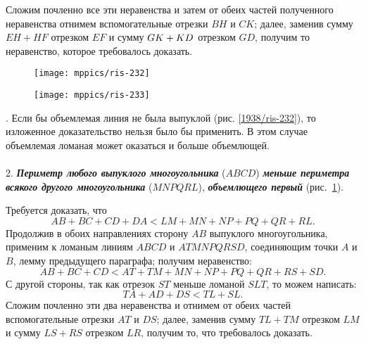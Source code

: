 Сложим почленно все эти неравенства и затем от обеих частей полученного неравенства отнимем вспомогательные отрезки $BH$ и $CK$;
далее, заменив сумму $EH+HF$ отрезком $EF$ и сумму $GK\z+KD$ отрезком $GD$, получим то неравенство, которое требовалось доказать.

\begin{figure}[!ht]
\begin{minipage}{.48\textwidth}
\centering
\texttt{[image: mppics/ris-232]}
\end{minipage}\hfill
\begin{minipage}{.48\textwidth}
\centering
\texttt{[image: mppics/ris-233]}
\end{minipage}

\medskip

\begin{minipage}{.48\textwidth}
\centering
\caption{}\label{1938/ris-232}
\end{minipage}\hfill
\begin{minipage}{.48\textwidth}
\centering
\caption{}\label{1938/ris-233}
\end{minipage}
\vskip-4mm
\end{figure}

{\small

\smallskip
\mbox{.}
Если бы объемлемая линия не была выпуклой (рис. \ref{1938/ris-232}), то изложенное доказательство нельзя было бы применить.
В этом случае объемлемая ломаная может оказаться и больше объемлющей.

}

\paragraph{}\label{1938/233}
 2.
\textbf{\emph{Периметр любого выпуклого многоугольника}} ($ABCD$) \textbf{\emph{меньше периметра всякого другого многоугольника}} ($MNPQRL$), \textbf{\emph{объемлющего первый}} (рис.~\ref{1938/ris-233}).


Требуется доказать, что
\[AB+BC+CD+DA < LM+MN+NP+PQ+QR+RL.\]
Продолжив в обоих направлениях сторону $AB$ выпуклого многоугольника, применим к ломаным линиям $ABCD$ и $ATMNPQRSD$, соединяющим точки $A$ и $B$, лемму предыдущего параграфа;
получим неравенство:
\[AB+BC+CD<AT+TM+MN+NP+PQ+QR+RS+SD.\]
С другой стороны, так как отрезок $ST$ меньше ломаной $SLT$, то можем написать:
\[TA+AD+DS<TL+SL.\]
Сложим почленно эти два неравенства и отнимем от обеих частей вспомогательные отрезки $AT$ и $DS$;
далее, заменив сумму $TL+TM$ отрезком $LM$ и сумму $LS+RS$ отрезком $LR$, получим то, что требовалось доказать.

